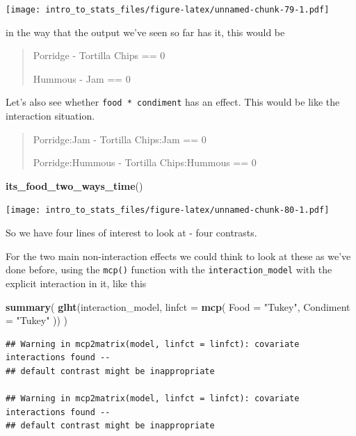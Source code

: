 \documentclass[
]{book}
\newenvironment{Shaded}{\begin{snugshade}}{\end{snugshade}}
\newcommand{\DataTypeTok}[1]{\textcolor[rgb]{0.13,0.29,0.53}{#1}}
\newcommand{\KeywordTok}[1]{\textcolor[rgb]{0.13,0.29,0.53}{\textbf{#1}}}
\newcommand{\NormalTok}[1]{#1}
\newcommand{\StringTok}[1]{\textcolor[rgb]{0.31,0.60,0.02}{#1}}
\begin{document}
\texttt{[image: intro\_to\_stats\_files/figure-latex/unnamed-chunk-79-1.pdf]}

in the way that the output we've seen so far has it, this would be

\begin{quote}
Porridge - Tortilla Chips == 0

Hummous - Jam == 0
\end{quote}

Let's also see whether \texttt{food\ *\ condiment} has an effect. This would be like the interaction situation.

\begin{quote}
Porridge:Jam - Tortilla Chips:Jam == 0

Porridge:Hummous - Tortilla Chips:Hummous == 0
\end{quote}

\begin{Shaded}
\begin{Highlighting}[]
\KeywordTok{its_food_two_ways_time}\NormalTok{()}
\end{Highlighting}
\end{Shaded}

\texttt{[image: intro\_to\_stats\_files/figure-latex/unnamed-chunk-80-1.pdf]}

So we have four lines of interest to look at - four contrasts.

For the two main non-interaction effects we could think to look at these as we've done before, using the \texttt{mcp()} function with the \texttt{interaction\_model} with the explicit interaction in it, like this

\begin{Shaded}
\begin{Highlighting}[]
\KeywordTok{summary}\NormalTok{(}
  \KeywordTok{glht}\NormalTok{(interaction_model, }\DataTypeTok{linfct =} \KeywordTok{mcp}\NormalTok{(}
    \DataTypeTok{Food =} \StringTok{"Tukey"}\NormalTok{,}
    \DataTypeTok{Condiment =} \StringTok{"Tukey"}
\NormalTok{  ))}
\NormalTok{)}
\end{Highlighting}
\end{Shaded}

\begin{verbatim}
## Warning in mcp2matrix(model, linfct = linfct): covariate interactions found --
## default contrast might be inappropriate

## Warning in mcp2matrix(model, linfct = linfct): covariate interactions found --
## default contrast might be inappropriate
\end{verbatim}
\end{document}
